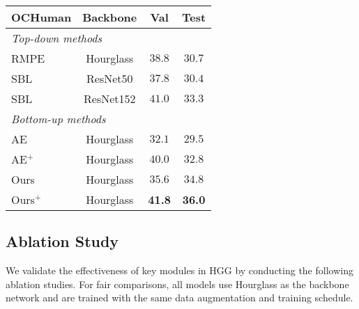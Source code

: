 \documentclass[runningheads]{llncs}
\begin{document}
\begin{table}[t]
\begin{subtable}[b]{0.45\textwidth}
			\caption{}
			\label{tab:coco_test_dev_all}
		\end{subtable}
		\quad
		\begin{subtable}[b]{0.5\textwidth}
			\centering
			\scriptsize
			\setlength{\tabcolsep}{2.0pt}
			\begin{tabular}{l|c|c|c}
				\hline
				OCHuman & Backbone &  Val & Test  \\
				\hline
				\multicolumn{4}{l}{\emph{Top-down methods}} \\ \hline
				RMPE~\cite{fang2017rmpe} & Hourglass &${38.8}$ &${30.7}$  \\
				SBL~\cite{xiao2018simple} & ResNet50 &${37.8}$ & ${30.4}$ \\
				SBL~\cite{xiao2018simple} & ResNet152 &${41.0}$ & ${33.3}$ \\
				\hline
				\multicolumn{4}{l}{\emph{Bottom-up methods}} \\ \hline
				AE~\cite{newell2017associative} & Hourglass  &$32.1$ & $29.5$\\
				AE$^{+}$~\cite{newell2017associative} & Hourglass &$40.0$ & $32.8$\\
				Ours &  Hourglass &$35.6$ & $34.8$\\
				Ours$^{+}$  & Hourglass  & \textbf{41.8} & \textbf{36.0}\\ \hline
			\end{tabular}
			\caption{}
			\label{tab:OChuman}
		\end{subtable}
	\end{table}
	
	
	\subsection{Ablation Study}
	We validate the effectiveness of key modules in HGG by conducting the following ablation studies. For fair comparisons, all models use Hourglass as the backbone network and are trained with the same data augmentation and training schedule.
	
\end{document}
